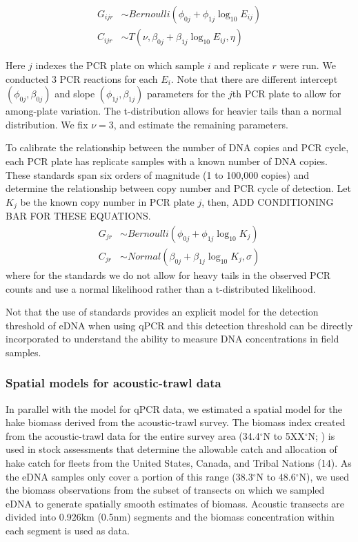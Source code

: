 \documentclass[
]{article}
\begin{document}
\begin{align}
  G_{ijr} &\sim Bernoulli(\phi_{0j}+\phi_{1j}\log_{10}E_{ij})\\
  C_{ijr} &\sim T(\nu,\beta_{0j}+\beta_{1j}\log_{10}E_{ij},\eta)
\end{align}

Here \(j\) indexes the PCR plate on which sample \(i\) and replicate
\(r\) were run. We conducted 3 PCR reactions for each \(E_i\). Note that
there are different intercept \((\phi_{0j},\beta_{0j})\) and slope
\((\phi_{1j},\beta_{1j})\) parameters for the \(j\)th PCR plate to allow
for among-plate variation. The t-distribution allows for heavier tails
than a normal distribution. We fix \(\nu = 3\), and estimate the
remaining parameters.

To calibrate the relationship between the number of DNA copies and PCR
cycle, each PCR plate has replicate samples with a known number of DNA
copies. These standards span six orders of magnitude (1 to 100,000
copies) and determine the relationship between copy number and PCR cycle
of detection. Let \(K_j\) be the known copy number in PCR plate \(j\),
then, ADD CONDITIONING BAR FOR THESE EQUATIONS. \begin{align}
  G_{jr} &\sim Bernoulli(\phi_{0j}+\phi_{1j}\log_{10}K_{j})\\
  C_{jr} &\sim Normal(\beta_{0j}+\beta_{1j}\log_{10}K_{j},\sigma)
\end{align} where for the standards we do not allow for heavy tails in
the observed PCR counts and use a normal likelihood rather than a
t-distributed likelihood.

Not that the use of standards provides an explicit model for the
detection threshold of eDNA when using qPCR and this detection threshold
can be directly incorporated to understand the ability to measure DNA
concentrations in field samples.

\hypertarget{spatial-models-for-acoustic-trawl-data}{%
\subsubsection{Spatial models for acoustic-trawl
data}\label{spatial-models-for-acoustic-trawl-data}}

In parallel with the model for qPCR data, we estimated a spatial model
for the hake biomass derived from the acoustic-trawl survey. The biomass
index created from the acoustic-trawl data for the entire survey area
(34.4\(^{\circ}\)N to 5XX\(^{\circ}\)N; ) is used in stock assessments
that determine the allowable catch and allocation of hake catch for
fleets from the United States, Canada, and Tribal Nations (14). As the
eDNA samples only cover a portion of this range (38.3\(^{\circ}\)N to
48.6\(^{\circ}\)N), we used the biomass observations from the subset of
transects on which we sampled eDNA to generate spatially smooth
estimates of biomass. Acoustic transects are divided into 0.926km
(0.5nm) segments and the biomass concentration within each segment is
used as data.
\end{document}

